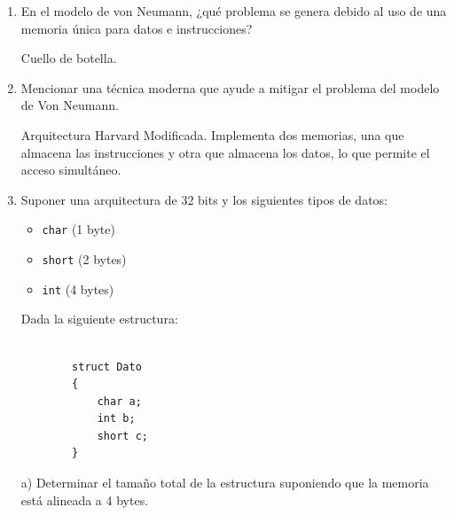 \documentclass[a4paper, 11pt]{article}
\newcommand{\Pspace}{0.5cm}
\newcommand{\Aspace}{0.2cm}
\begin{document}
    \vspace{0.3cm}
    \begin{enumerate}
    \vspace{\Pspace}
    \item En el modelo de von Neumann, ¿qué problema se genera debido al uso de una memoria única para datos e instrucciones? \par
        \vspace{\Aspace} \par
        { \color{azul} Cuello de botella. }



    \vspace{\Pspace}
    \item Mencionar una técnica moderna que ayude a mitigar el problema del modelo de Von Neumann. \par
        \vspace{\Aspace} \par
        { \color{azul} Arquitectura Harvard Modificada. Implementa dos memorias, una que almacena las instrucciones y otra que almacena los datos, lo que permite el acceso simultáneo. }



    \vspace{\Pspace}
    \item Suponer una arquitectura de 32 bits y los siguientes tipos de datos:
    \begin{itemize}
        \item \texttt{char} (1 byte)
        \item \texttt{short} (2 bytes)
        \item \texttt{int} (4 bytes)
    \end{itemize}
    Dada la siguiente estructura:
    \begin{verbatim}

        struct Dato
        {
            char a;
            int b;
            short c;
        }

    \end{verbatim}
        \newpage
        a) Determinar el tamaño total de la estructura suponiendo que la memoria está alineada a 4 bytes.
        \\ { \color{azul} 

}
\end{enumerate}
\end{document}
